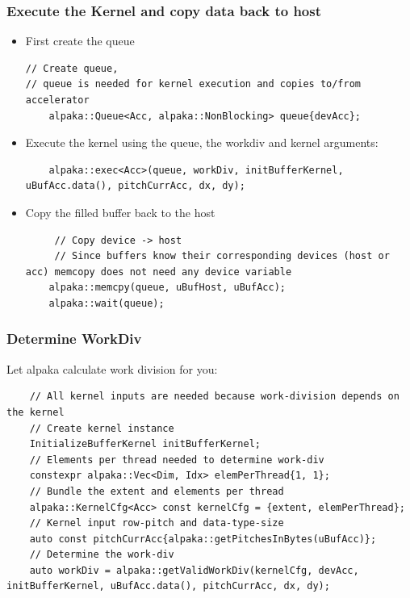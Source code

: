 \documentclass[9pt]{beamer}
\begin{document}
\begin{frame}[fragile]
\frametitle{Execute the Kernel and copy data back to host}
\begin{itemize}

\item First create the queue
\lstset{basicstyle=\ttfamily\scriptsize}
\begin{lstlisting}
// Create queue,
// queue is needed for kernel execution and copies to/from accelerator
    alpaka::Queue<Acc, alpaka::NonBlocking> queue{devAcc};
\end{lstlisting}

\item Execute the kernel using the queue, the workdiv and kernel arguments:
\lstset{basicstyle=\ttfamily\scriptsize}
\begin{lstlisting}
    alpaka::exec<Acc>(queue, workDiv, initBufferKernel, uBufAcc.data(), pitchCurrAcc, dx, dy);
\end{lstlisting}
\item Copy the filled buffer back to the host
\begin{lstlisting}
     // Copy device -> host
     // Since buffers know their corresponding devices (host or acc) memcopy does not need any device variable
    alpaka::memcpy(queue, uBufHost, uBufAcc);
    alpaka::wait(queue);
\end{lstlisting}
\end{itemize}
\end{frame}

\begin{frame}[fragile]
\frametitle{Determine WorkDiv}
Let alpaka calculate work division for you:
\lstset{basicstyle=\ttfamily\scriptsize}
\begin{lstlisting}
    // All kernel inputs are needed because work-division depends on the kernel
    // Create kernel instance
    InitializeBufferKernel initBufferKernel;
    // Elements per thread needed to determine work-div
    constexpr alpaka::Vec<Dim, Idx> elemPerThread{1, 1};
    // Bundle the extent and elements per thread
    alpaka::KernelCfg<Acc> const kernelCfg = {extent, elemPerThread};
    // Kernel input row-pitch and data-type-size
    auto const pitchCurrAcc{alpaka::getPitchesInBytes(uBufAcc)};
    // Determine the work-div
    auto workDiv = alpaka::getValidWorkDiv(kernelCfg, devAcc, initBufferKernel, uBufAcc.data(), pitchCurrAcc, dx, dy);
\end{lstlisting}
\end{frame}
\end{document}
